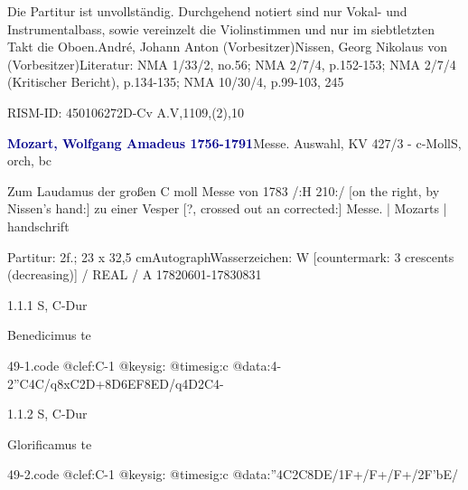 \documentclass[a4paper, twocolumn, 11pt]{book}
\begin{document}
\par Die Partitur ist unvollständig. Durchgehend notiert sind nur Vokal- und Instrumentalbass, sowie vereinzelt die Violinstimmen und nur im siebtletzten Takt die Oboen.\newline André, Johann Anton  (Vorbesitzer)\newline Nissen, Georg Nikolaus von  (Vorbesitzer)\newline Literatur: NMA  1/33/2, no.56; NMA  2/7/4, p.152-153; NMA  2/7/4 (Kritischer Bericht), p.134-135; NMA  10/30/4, p.99-103, 245
\par RISM-ID: 450106272\newline D-Cv  A.V,1109,(2),10
\par \vspace{16pt} \textcolor{darkblue}{\textbf{Mozart, Wolfgang Amadeus  1756-1791}}\hfillplus{[49]}\newline Messe. Auswahl, KV 427/3 - c-Moll\newline S, orch, bc
\par \begin{itshape} Zum Laudamus der großen C moll Messe von 1783 /:H 210:/ [on the right, by Nissen's hand:] zu einer Vesper [?, crossed out an corrected:] Messe. | Mozarts | handschrift\end{itshape} 
\par \textcolor{darkblue}{}  Partitur: 2f.; 23 x 32,5 cm\newline Autograph\newline Wasserzeichen: W [countermark: 3 crescents (decreasing)] / REAL / A  17820601-17830831
\par 1.1.1  S, C-Dur\newline \begin{footnotesize} Benedicimus te \end{footnotesize}  
\begin{filecontents*}{49-1.code}
@clef:C-1
@keysig:
@timesig:c
@data:4-2''C4C/q8xC2D+{8D6EF}8ED/q4D2C4-
\end{filecontents*}
\newline %
\par 1.1.2  S, C-Dur\newline \begin{footnotesize} Glorificamus te \end{footnotesize}  
\begin{filecontents*}{49-2.code}
@clef:C-1
@keysig:
@timesig:c
@data:''4C2C{8DE}/1F+/F+/F+/2F'bE/
\end{filecontents*}
\end{document}
